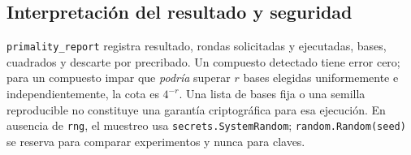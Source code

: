 \subsection{Interpretación del resultado y seguridad}
\texttt{primality\_report} registra resultado, rondas solicitadas y ejecutadas, bases, cuadrados y descarte por precribado. Un compuesto detectado tiene error cero; para un compuesto impar que \emph{podría} superar $r$ bases elegidas uniformemente e independientemente, la cota es $4^{-r}$. Una lista de bases fija o una semilla reproducible no constituye una garantía criptográfica para esa ejecución. En ausencia de \texttt{rng}, el muestreo usa \texttt{secrets.SystemRandom}; \texttt{random.Random(seed)} se reserva para comparar experimentos y nunca para claves.
